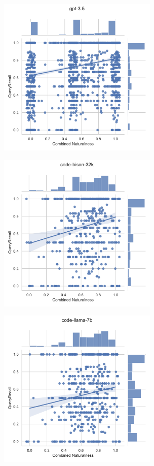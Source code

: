   \begin{figure}
    \centering
    \begin{subfigure}{.5\textwidth}
      \centering
      \includegraphics[height=3in]{figures/distribution-jointplots/jointplot-gpt-3.5-combined-nat-all-schemas-recall-with-distributions.pdf}
    \end{subfigure}%
    \begin{subfigure}{.5\textwidth}
      \centering
      \includegraphics[height=3in]{figures/distribution-jointplots/jointplot-code-bison-32k-combined-nat-all-schemas-recall-with-distributions.pdf}
    \end{subfigure}
    \begin{subfigure}{.5\textwidth}
      \centering
      \includegraphics[height=3in]{figures/distribution-jointplots/jointplot-code-llama-7b-combined-nat-all-schemas-recall-with-distributions.pdf}

\end{subfigure}
\end{figure}
